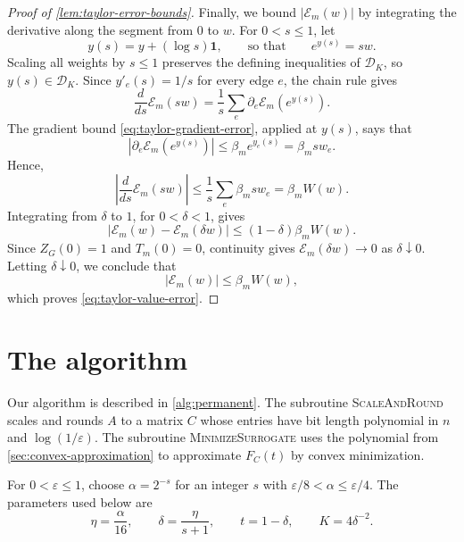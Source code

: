 \documentclass[11pt,reqno,letterpaper]{amsart}
\numberwithin{equation}{section}
\theoremstyle{definition}
\theoremstyle{remark}
\newcommand{\one}{\mathbf 1}
\newcommand{\cD}{\mathcal D}
\begin{document}
\begin{proof}[Proof of \cref{lem:taylor-error-bounds}]
Finally, we bound $|\mathcal E_m(w)|$ by integrating the derivative
along the segment from $0$ to $w$. For $0<s\le1$, let
\[
 y(s)=y+(\log s)\one,
 \qquad\text{so that}\qquad e^{y(s)}=sw.
\]
Scaling all weights by $s\le1$ preserves the defining inequalities
of $\cD_K$, so $y(s)\in\cD_K$. Since $y'_e(s)=1/s$ for every
edge $e$, the chain rule gives
\[
 \frac{d}{ds}\mathcal E_m(sw)
 =\frac1s\sum_e\partial_e\mathcal E_m(e^{y(s)}).
\]
The gradient bound \cref{eq:taylor-gradient-error}, applied at $y(s)$,
says that
\[
 |\partial_e\mathcal E_m(e^{y(s)})|
 \le \beta_m e^{y_e(s)}=\beta_msw_e.
\]
Hence,
\[
 \left|\frac{d}{ds}\mathcal E_m(sw)\right|
 \le\frac1s\sum_e \beta_msw_e
 =\beta_mW(w).
\]
Integrating from $\delta$ to $1$, for $0<\delta<1$, gives
\[
 |\mathcal E_m(w)-\mathcal E_m(\delta w)|
 \le(1-\delta)\beta_mW(w).
\]
Since $Z_G(0)=1$ and $T_m(0)=0$, continuity gives
$\mathcal E_m(\delta w)\to0$ as $\delta\downarrow0$.
Letting $\delta\downarrow0$, we conclude that
\[
 |\mathcal E_m(w)|\le \beta_mW(w),
\]
which proves \cref{eq:taylor-value-error}.
\end{proof}
\section{The algorithm}\label{sec:algorithm}

Our algorithm is described in \cref{alg:permanent}.
The subroutine \textsc{ScaleAndRound} scales and rounds $A$ to a matrix
$C$ whose entries have bit length polynomial in $n$ and $\log(1/\varepsilon)$.
The subroutine \textsc{MinimizeSurrogate} uses the polynomial from
\cref{sec:convex-approximation} to approximate $F_C(t)$ by convex minimization.

For $0<\varepsilon\le1$, choose $\alpha=2^{-s}$ for an integer $s$ with
$\varepsilon/8<\alpha\le\varepsilon/4$. The parameters used below are
\begin{equation}\label{eq:algorithm-parameters}
 \eta=\frac{\alpha}{16},\qquad \delta=\frac{\eta}{s+1},\qquad
 t=1-\delta,\qquad K=4\delta^{-2}.
\end{equation}
\end{document}
